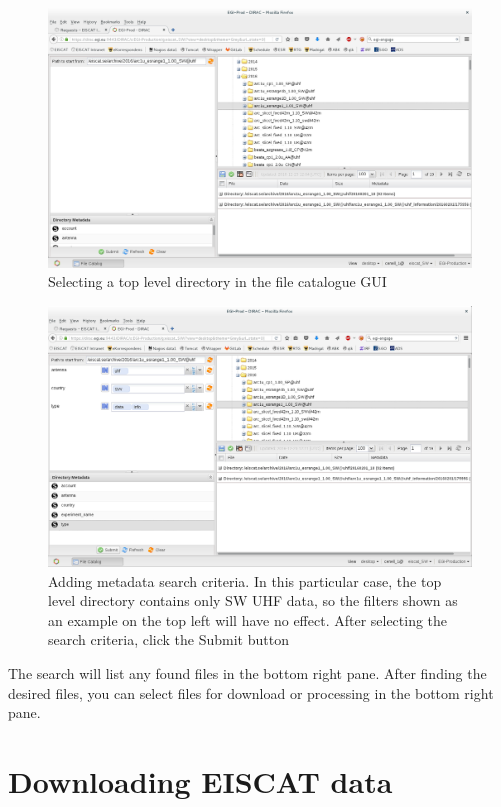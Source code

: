 \documentclass[a4paper]{article}
\begin{document}
\begin{figure}[htb]
  \centering
  \includegraphics[width=1.0\linewidth]{dirac-gui-catalogue}
  \caption{Selecting a top level directory in the file catalogue GUI}
  \label{fig:catalogue}
\end{figure}

\begin{figure}[htb]
  \centering
  \includegraphics[width=1.0\linewidth]{dirac-gui-search}
  \caption{Adding metadata search criteria. In this particular case, the top level directory contains only SW UHF data, so the filters shown as an example on the top left will have no effect. After selecting the search criteria, click the Submit button}
  \label{fig:search}
\end{figure}


The search will list any found files in the bottom right pane.  After
finding the desired files, you can select files for download or
processing in the bottom right pane.

\section{Downloading EISCAT data}
\label{sec:download}
\end{document}
